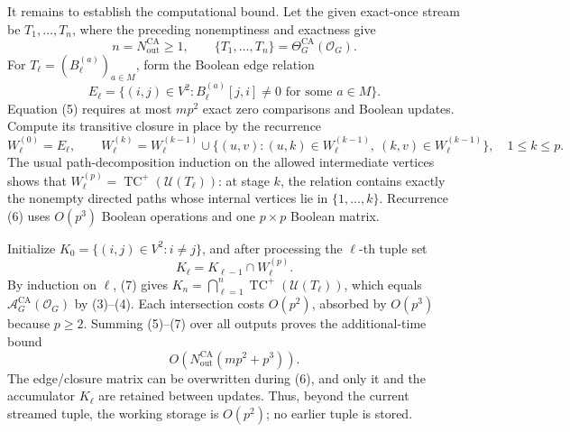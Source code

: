 It remains to establish the computational bound.  Let the given exact-once
stream be \(T_1,\ldots,T_n\), where the preceding nonemptiness and exactness
give
\[
 n=N_{\mathrm{out}}^{\mathrm{CA}}\geq1,
 \qquad
 \{T_1,\ldots,T_n\}=\Theta_G^{\mathrm{CA}}(\mathcal O_G).
 \tag{4}
\]
For \(T_\ell=(B_\ell^{(a)})_{a\in M}\), form the Boolean edge relation
\[
 E_\ell=\{(i,j)\in V^2:
              B_\ell^{(a)}[j,i]\ne0
              \text{ for some }a\in M\}.
 \tag{5}
\]
Equation (5) requires at most \(mp^2\) exact zero comparisons and Boolean
updates.  Compute its transitive closure in place by the recurrence
\[
 W_\ell^{(0)}=E_\ell,
 \qquad
 W_\ell^{(k)}=W_\ell^{(k-1)}\cup
 \bigl\{(u,v):
 (u,k)\in W_\ell^{(k-1)},\ (k,v)\in W_\ell^{(k-1)}\bigr\},
 \quad 1\leq k\leq p.
 \tag{6}
\]
The usual path-decomposition induction on the allowed intermediate vertices
shows that \(W_\ell^{(p)}=\operatorname{TC}^{+}(\mathcal U(T_\ell))\): at
stage \(k\), the relation contains exactly the nonempty directed paths whose
internal vertices lie in \(\{1,\ldots,k\}\).  Recurrence (6) uses
\(O(p^3)\) Boolean operations and one \(p\times p\) Boolean matrix.

Initialize \(K_0=\{(i,j)\in V^2:i\ne j\}\), and after processing the
\(\ell\)-th tuple set
\[
 K_\ell=K_{\ell-1}\cap W_\ell^{(p)}.
 \tag{7}
\]
By induction on \(\ell\), (7) gives
\(K_n=\bigcap_{\ell=1}^n
\operatorname{TC}^{+}(\mathcal U(T_\ell))\), which equals
\(\mathcal A_G^{\mathrm{CA}}(\mathcal O_G)\) by (3)--(4).  Each intersection
costs \(O(p^2)\), absorbed by \(O(p^3)\) because \(p\geq2\).  Summing (5)--(7)
over all outputs proves the additional-time bound
\[
 O\!\left(N_{\mathrm{out}}^{\mathrm{CA}}(mp^2+p^3)\right).
\]
The edge/closure matrix can be overwritten during (6), and only it and the
accumulator \(K_\ell\) are retained between updates.  Thus, beyond the current
streamed tuple, the working storage is \(O(p^2)\); no earlier tuple is stored.
